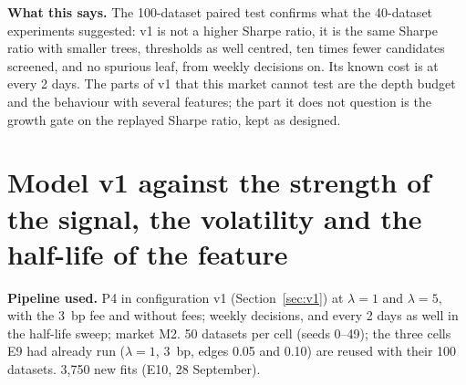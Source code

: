 \documentclass[11pt,a4paper]{article}
\newcommand{\1}{\mathbf{1}}
\begin{document}
\textbf{What this says.} The 100-dataset paired test confirms what the 40-dataset experiments suggested: v1 is not a higher Sharpe ratio, it is the same Sharpe ratio with smaller trees, thresholds as well centred, ten times fewer candidates screened, and no spurious leaf, from weekly decisions on. Its known cost is at every 2 days. The parts of v1 that this market cannot test are the depth budget and the behaviour with several features; the part it does not question is the growth gate on the replayed Sharpe ratio, kept as designed.

\section{Model v1 against the strength of the signal, the volatility and the half-life of the feature}\label{sec:v1sweeps}
\textbf{Pipeline used.} P4 in configuration v1 (Section~\ref{sec:v1}) at $\lambda=1$ and $\lambda=5$, with the 3~bp fee and without fees; weekly decisions, and every 2 days as well in the half-life sweep; market M2. 50 datasets per cell (seeds 0--49); the three cells E9 had already run ($\lambda=1$, 3~bp, edges 0.05 and 0.10) are reused with their 100 datasets. 3{,}750 new fits (E10, 28 September).
\end{document}
